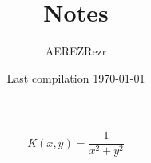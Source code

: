 \documentclass{article}
\begin{document}

\title{Notes
}

\author{AEREZRezr}



\date{
   Last compilation \today
      }

\maketitle
{}

	\begin{equation}
	    K(x,y) = \frac{1}{x^2+y^2}
	\end{equation}
\end{document}
